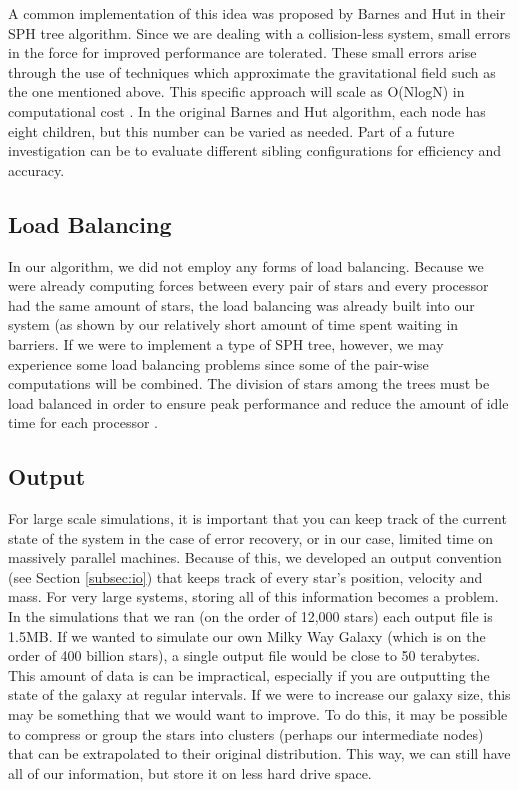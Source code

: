 \documentclass{article}
\begin{document}
A common implementation of this idea was proposed by Barnes and Hut in their SPH tree algorithm.  Since we are dealing with a collision-less system, small errors in the force for improved performance are tolerated.  These small errors arise through the use of techniques which approximate the gravitational field such as the one mentioned above.  This specific approach will scale as O(NlogN) in computational cost \cite{parallel-tree-code}.  In the original Barnes and Hut algorithm, each node has eight children, but this number can be varied as needed.  Part of a future investigation can be to evaluate different sibling configurations for efficiency and accuracy.

\subsection{Load Balancing}

In our algorithm, we did not employ any forms of load balancing.  Because we were already computing forces between every pair of stars and every processor had the same amount of stars, the load balancing was already built into our system (as shown by our relatively short amount of time spent waiting in barriers.  If we were to implement a type of SPH tree, however, we may experience some load balancing problems since some of the pair-wise computations will be combined.  The division of stars among the trees must be load balanced in order to ensure peak performance and reduce the amount of idle time for each processor \cite{parallel-treesph}. 

\subsection{Output}

For large scale simulations, it is important that you can keep track of the current state of the system in the case of error recovery, or in our case, limited time on massively parallel machines.  Because of this, we developed an output convention (see Section \ref{subsec:io}) that keeps track of every star's position, velocity and mass.  For very large systems, storing all of this information becomes a problem.  In the simulations that we ran (on the order of 12,000 stars) each output file is 1.5MB.  If we wanted to simulate our own Milky Way Galaxy (which is on the order of 400 billion stars), a single output file would be close to 50 terabytes.  This amount of data is can be impractical, especially if you are outputting the state of the galaxy at regular intervals.  If we were to increase our galaxy size, this may be something that we would want to improve.  To do this, it may be possible to compress or group the stars into clusters (perhaps our intermediate nodes) that can be extrapolated to their original distribution. This way, we can still have all of our information, but store it on less hard drive space.  
\end{document}
